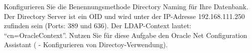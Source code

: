     \item Konfigurieren Sie die Benennungsmethode Directory Naming f\"ur Ihre
    Datenbank. Der Directory Server ist ein OID und wird unter der IP-Adresse
    192.168.111.250 zufinden sein (Ports: 389 und 636). Der LDAP-Context
    lautet: \enquote{cn=OracleContext}. Nutzen Sie f\"ur diese Aufgabe den
    Oracle Net Configuration Assistant ( - Konfigurieren von
    Directoy-Verwendung).
